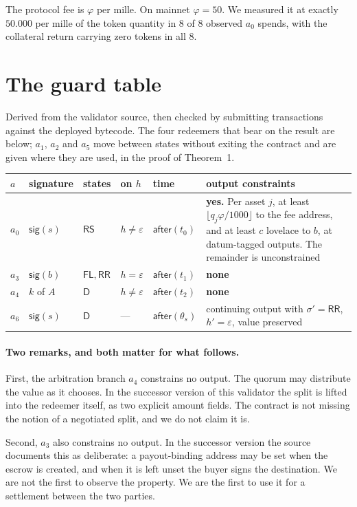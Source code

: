 \documentclass[11pt]{article}
\theoremstyle{remark}
\newcommand{\FL}{\mathsf{FL}}
\newcommand{\RS}{\mathsf{RS}}
\newcommand{\RR}{\mathsf{RR}}
\newcommand{\Dd}{\mathsf{D}}
\newcommand{\sg}{\mathsf{sig}}
\newcommand{\afterr}{\mathsf{after}}
\begin{document}
The protocol fee is $\varphi$ per mille. On mainnet $\varphi = 50$. We measured it at exactly $50.000$ per mille of
the token quantity in 8 of 8 observed $a_0$ spends, with the collateral return carrying zero tokens in all 8.

\section{The guard table}

Derived from the validator source, then checked by submitting transactions against the deployed bytecode. The four
redeemers that bear on the result are below; $a_1$, $a_2$ and $a_5$ move between states without exiting the contract
and are given where they are used, in the proof of Theorem~1.

\begin{center}
\small
\begin{tabular}{@{}llllp{1.7cm}p{5.0cm}@{}}
\toprule
$a$ & signature & states & on $h$ & time & output constraints \\
\midrule
$a_0$ & $\sg(s)$ & $\RS$ & $h \neq \varepsilon$ & $\afterr(t_0)$ &
  \textbf{yes.} Per asset $j$, at least $\lfloor q_j\varphi/1000 \rfloor$ to the fee address, and at least $c$
  lovelace to $b$, at datum-tagged outputs. The remainder is unconstrained \\
$a_3$ & $\sg(b)$ & $\FL, \RR$ & $h = \varepsilon$ & $\afterr(t_1)$ & \textbf{none} \\
$a_4$ & $k$ of $A$ & $\Dd$ & $h \neq \varepsilon$ & $\afterr(t_2)$ & \textbf{none} \\
$a_6$ & $\sg(s)$ & $\Dd$ & --- & $\afterr(\theta_s)$ &
  continuing output with $\sigma' = \RR$, $h' = \varepsilon$, value preserved \\
\bottomrule
\end{tabular}
\end{center}

\paragraph{Two remarks, and both matter for what follows.}
First, the arbitration branch $a_4$ constrains no output. The quorum may distribute the value as it chooses. In the
successor version of this validator the split is lifted into the redeemer itself, as two explicit amount fields. The
contract is not missing the notion of a negotiated split, and we do not claim it is.

Second, $a_3$ also constrains no output. In the successor version the source documents this as deliberate: a
payout-binding address may be set when the escrow is created, and when it is left unset the buyer signs the
destination. We are not the first to observe the property. We are the first to use it for a settlement between the
two parties.
\end{document}
